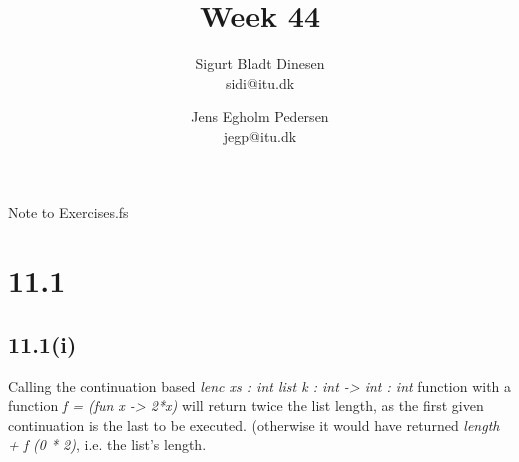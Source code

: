 \documentclass[a4paper, titlepage]{article}
\begin{document}
\title{Week 44}
\author{Sigurt Bladt Dinesen \\sidi{@}itu.dk 
  \and Jens Egholm Pedersen \\jegp{@}itu.dk}
\maketitle

Note to  Exercises.fs
\section*{11.1}
\subsection*{11.1(i)}
Calling the continuation based \emph{lenc xs : int list k : int -> int : int} function with a function
\emph{f = (fun x -> 2*x)} will return twice the list length, as the first given
continuation is the last to be executed. (otherwise it would have returned
\emph{length + f (0 * 2)}, i.e. the list's length.
\end{document}
